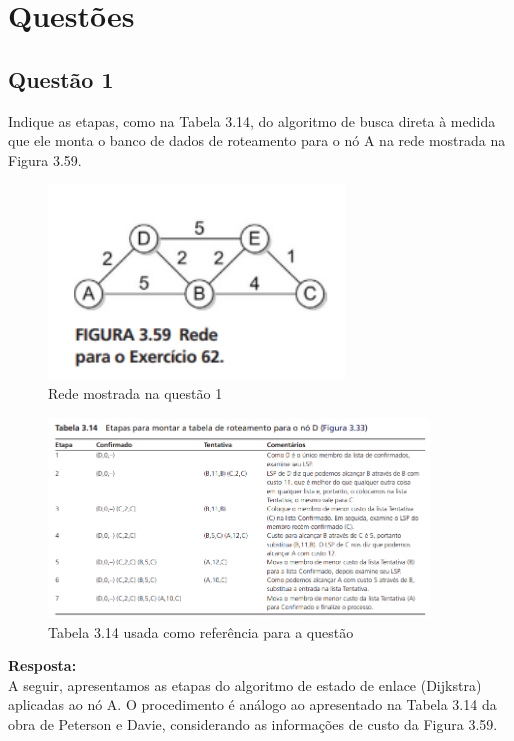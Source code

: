 \section{Questões}\label{sec:questoes}


\subsection{Questão 1}
Indique as etapas, como na Tabela 3.14, do algoritmo de busca direta à medida que ele monta o
banco de dados de roteamento para o nó A na rede mostrada na Figura 3.59.

\begin{figure}[H]
    \centering
    \includegraphics[width=0.7\textwidth]{images/ex_62.png}
    \caption{Rede mostrada na questão 1}
    \label{fig:questao_1}
\end{figure}

\begin{figure}[H]
    \centering
    \includegraphics[width=0.9\textwidth]{images/tabela_3_14.png}
    \caption{Tabela 3.14 usada como referência para a questão} 
    \label{fig:questao_1_tabela}
\end{figure}

\textbf{Resposta:} \\
A seguir, apresentamos as etapas do algoritmo de estado de enlace (Dijkstra) aplicadas ao nó A. O procedimento é análogo ao apresentado na Tabela 3.14 da obra de Peterson e Davie, considerando as informações de custo da Figura 3.59.

